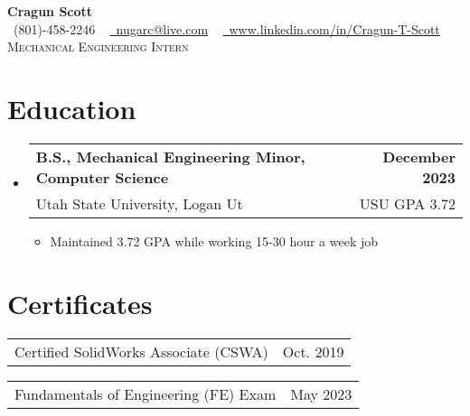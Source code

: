 \documentclass[letterpaper,11pt]{article}
\makeatletter
\newcommand{\resumeSubheading}[4]{
  \vspace{-2pt}\item
    \begin{tabular*}{1.0\textwidth}[t]{l@{\extracolsep{\fill}}r}
      \textbf{#1} & \textbf{\small #2} \\
      \normalsize#3 & \small #4 \\
    \end{tabular*}\vspace{-7pt}
}
\newcommand{\resumeSubSubheading}[2]{
  \vspace{-5pt}
  \begin{tabular*}{0.97\textwidth}{l@{\extracolsep{\fill}}r}
      \small#1 & \small #2 \\
    \end{tabular*}
}
\newcommand{\resumeSubHeadingListStart}{\begin{itemize}[leftmargin=0.0in, label={}]}
\newcommand{\resumeSubHeadingListEnd}{\end{itemize}}
\makeatother
\begin{document}
\begin{center}
    \textbf{{\Huge  Cragun Scott}} \\ \vspace{1pt}
    \large
    \raisebox{-0.1\height}\faPhone\ (801)-458-2246 ~
    \href{mailto:youremail@gmail.com}{\faEnvelope\ nugarc@live.com} ~ 
    \href{https://linkedin.com/in/}{\faLinkedin\ www.linkedin.com/in/Cragun-T-Scott}  ~
    \\ \vspace{4pt}
    {\huge	 \scshape Mechanical Engineering Intern} 
    \vspace{-12pt}
\end{center}

\section{Education}
  \resumeSubHeadingListStart
    \resumeSubheading
      {B.S., Mechanical Engineering	Minor, Computer Science}{December 2023}
      {Utah State University, Logan Ut}{USU GPA 3.72}
    \begin{itemize}
        \vspace{-1pt}
        \item Maintained 3.72 GPA while working 15-30 hour a week job
    \end{itemize}
\resumeSubHeadingListEnd
\vspace{-22pt}

\section{Certificates}
    \resumeSubSubheading
        {Certified SolidWorks Associate (CSWA) }{Oct. 2019} 
    \resumeSubSubheading
      {Fundamentals of Engineering (FE) Exam}{May 2023}
    \vspace{-10pt}    

\end{document}
